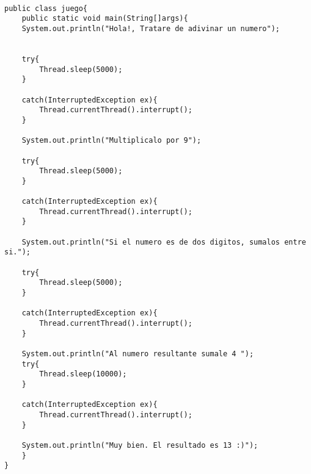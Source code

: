 \documentclass{article}
\begin{document}
\begin{verbatim}

public class juego{
    public static void main(String[]args){
	System.out.println("Hola!, Tratare de adivinar un numero");


	try{
	    Thread.sleep(5000);
	}

	catch(InterruptedException ex){
	    Thread.currentThread().interrupt();
	}

	System.out.println("Multiplicalo por 9");

	try{
	    Thread.sleep(5000);
	}

	catch(InterruptedException ex){
	    Thread.currentThread().interrupt();
	}

	System.out.println("Si el numero es de dos digitos, sumalos entre si.");

	try{
	    Thread.sleep(5000);
	}

	catch(InterruptedException ex){
	    Thread.currentThread().interrupt();
	}

	System.out.println("Al numero resultante sumale 4 ");
	try{
	    Thread.sleep(10000);
	}

	catch(InterruptedException ex){
	    Thread.currentThread().interrupt();
	}
	
	System.out.println("Muy bien. El resultado es 13 :)");
    }
}
\end{verbatim}
\end{document}
